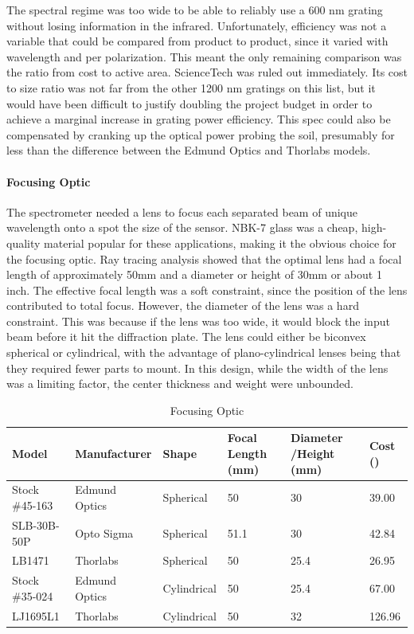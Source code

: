 The spectral regime was too wide to be able to reliably use a 600 nm grating without losing information in the infrared. Unfortunately, efficiency was not a variable that could be compared from product to product, since it varied with wavelength and per polarization. This meant the only remaining comparison was the ratio from cost to active area. ScienceTech was ruled out immediately. Its cost to size ratio was not far from the other 1200 nm gratings on this list, but it would have been difficult to justify doubling the project budget in order to achieve a marginal increase in grating power efficiency. This spec could also be compensated by cranking up the optical power probing the soil, presumably for less than the  difference between the Edmund Optics and Thorlabs models.
\paragraph{Focusing Optic}
The spectrometer needed a lens to focus each separated beam of unique wavelength onto a spot the size of the sensor. NBK-7 glass was a cheap, high-quality material popular for these applications, making it the obvious choice for the focusing optic. Ray tracing analysis showed that the optimal lens had a focal length of approximately 50mm and a diameter or height of 30mm or about 1 inch. The effective focal length was a soft constraint, since the position of the lens contributed to total focus. However, the diameter of the lens was a hard constraint. This was because if the lens was too wide, it would block the input beam before it hit the diffraction plate. The lens could either be biconvex spherical or cylindrical, with the advantage of plano-cylindrical lenses being that they required fewer parts to mount. In this design, while the width of the lens was a limiting factor, the center thickness and weight were unbounded.
\begin{table}[H]
	\centering
	\label{table:Focusing Optic}
	\caption{Focusing Optic}
	\bigskip
	\begin{tabular}{|p{3cm}|p{2.5cm}|p{2cm}|p{1.5cm}|p{1.75cm}|p{1.25cm}|}
	\hline
	Model & Manufacturer & Shape & Focal Length (mm) & Diameter /Height (mm) & Cost (\textdollar)\\
	\hline
	Stock \#45-163 & Edmund Optics & Spherical & 50 & 30 & 39.00\\
	\hline
	SLB-30B-50P & Opto Sigma & Spherical & 51.1 & 30 & 42.84\\
	\hline
	LB1471 & Thorlabs & Spherical & 50 & 25.4 & 26.95\\
	\hline
	Stock \#35-024 & Edmund Optics & Cylindrical & 50 & 25.4 & 67.00\\
	\hline
	LJ1695L1 & Thorlabs & Cylindrical & 50 & 32 & 126.96\\
	\hline
	\end{tabular}
\end{table}
